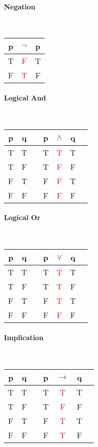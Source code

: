 \documentclass[a4paper, 10pt]{article}
\begin{document}
\begin{multicols}{3}
\paragraph{Negation}\mbox{}\\
\begin{tabular}{@{ }c | c@{ }@{ }c}
p & \( \neg \) & p\\
\hline
T & \textcolor{red}{F} & T\\
F & \textcolor{red}{T} & F\\
\end{tabular}
\paragraph{Logical And}\mbox{}\\
\begin{tabular}{@{ }c@{ }@{ }c | c@{ }@{ }c@{ }@{ }c@{ }@{ }c@{ }@{ }c}
p & q &  & p & \( \land\) & q & \\
\hline
T & T &  & T & \textcolor{red}{T} & T & \\
T & F &  & T & \textcolor{red}{F} & F & \\
F & T &  & F & \textcolor{red}{F} & T & \\
F & F &  & F & \textcolor{red}{F} & F & \\
\end{tabular}
\paragraph{Logical Or}\mbox{}\\
\begin{tabular}{@{ }c@{ }@{ }c | c@{ }@{ }c@{ }@{ }c@{ }@{ }c@{ }@{ }c}
p & q &  & p & \( \lor \) & q & \\
\hline
T & T &  & T & \textcolor{red}{T} & T & \\
T & F &  & T & \textcolor{red}{T} & F & \\
F & T &  & F & \textcolor{red}{T} & T & \\
F & F &  & F & \textcolor{red}{F} & F & \\
\end{tabular}
\paragraph{Implication}\mbox{}\\
\begin{tabular}{@{ }c@{ }@{ }c | c@{ }@{ }c@{ }@{ }c@{ }@{ }c@{ }@{ }c}
p & q &  & p & \(\rightarrow\) & q & \\
\hline
T & T &  & T & \textcolor{red}{T} & T & \\
T & F &  & T & \textcolor{red}{F} & F & \\
F & T &  & F & \textcolor{red}{T} & T & \\
F & F &  & F & \textcolor{red}{T} & F & \\
\end{tabular}

\end{multicols}
\end{document}
